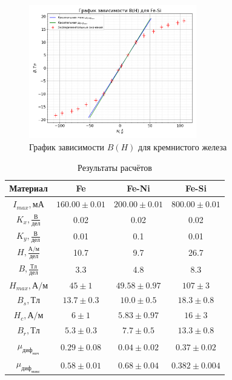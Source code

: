 \documentclass[a4paper, 12pt]{article}
\begin{document}
            \begin{figure}[!ht]
                \centering
                \includegraphics[width=0.65\textwidth]{img/plot_FeSi.png}
                \caption{График зависимости $B(H)$ для кремнистого железа}
                \label{plot:FeSi}
            \end{figure}

            \begin{table}[!ht]
                \centering
                \begin{tabular}{|c|c|c|c|}
                    \hline

                    Материал & Fe & Fe-Ni & Fe-Si\\ \hline
                    $I_{max}, мА$ & $160.00 \pm 0.01$ & $200.00 \pm 0.01$ & $800.00 \pm 0.01$\\ \hline
                    $K_x, \frac{В}{дел}$ & 0.02 & 0.02 & 0.02\\ \hline
                    $K_y, \frac{В}{дел}$ & 0.01 & 0.1 & 0.01\\ \hline
                    $H, \frac{А/м}{дел}$ & 10.7 & 9.7 & 26.7\\ \hline
                    $B, \frac{Тл}{дел}$ & 3.3 & 4.8 & 8.3\\ \hline
                    $H_{max}, А/м$ & $45 \pm 1$ & $49.58 \pm 0.97$ & $107 \pm 3$\\ \hline
                    $B_s, Тл$ & $13.7 \pm 0.3$ & $10.0 \pm 0.5$ & $18.3 \pm 0.8$\\ \hline
                    $H_c, А/м$ & $6 \pm 1$ & $5.83 \pm 0.97$ & $16 \pm 3$\\ \hline
                    $B_r, Тл$ & $5.3 \pm 0.3$ & $7.7 \pm 0.5$ & $13.3 \pm 0.8$\\ \hline
                    $\mu_{диф_{нач}}$ & $0.29 \pm 0.08$ & $0.04 \pm 0.02$ & $0.37 \pm 0.02$\\ \hline
                    $\mu_{диф_{макс}}$ & $0.58 \pm 0.01$ & $0.68 \pm 0.04$ & $0.382 \pm 0.004$\\ \hline

                \end{tabular}
                \caption{Результаты расчётов}
                \label{tab:res}
            \end{table}
\end{document}
